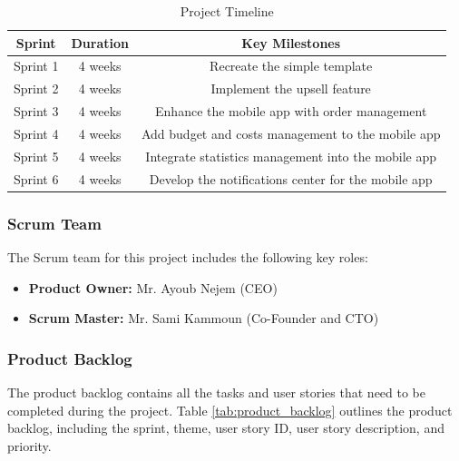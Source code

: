 \begin{table}[h]
  \centering
  \begin{tabular}{|c|c|c|}
    \hline
    \textbf{Sprint} & \textbf{Duration} & \textbf{Key Milestones} \\
    \hline
    Sprint 1 & 4 weeks & Recreate the simple template \\
    \hline
    Sprint 2 & 4 weeks & Implement the upsell feature \\
    \hline
    Sprint 3 & 4 weeks & Enhance the mobile app with order management \\
    \hline
    Sprint 4 & 4 weeks & Add budget and costs management to the mobile app \\
    \hline
    Sprint 5 & 4 weeks & Integrate statistics management into the mobile app \\
    \hline
    Sprint 6 & 4 weeks & Develop the notifications center for the mobile app \\
    \hline
  \end{tabular}
  \caption{Project Timeline}
  \label{tab:project_timeline}
\end{table}

\subsubsection{Scrum Team}
The Scrum team for this project includes the following key roles:
\begin{itemize}
    \item \textbf{Product Owner:} Mr. Ayoub Nejem (CEO)
    \item \textbf{Scrum Master:} Mr. Sami Kammoun (Co-Founder and CTO)
\end{itemize}

\subsubsection{Product Backlog}
The product backlog contains all the tasks and user stories that need to be completed during the project. Table \ref{tab:product_backlog} outlines the product backlog, including the sprint, theme, user story ID, user story description, and priority.

